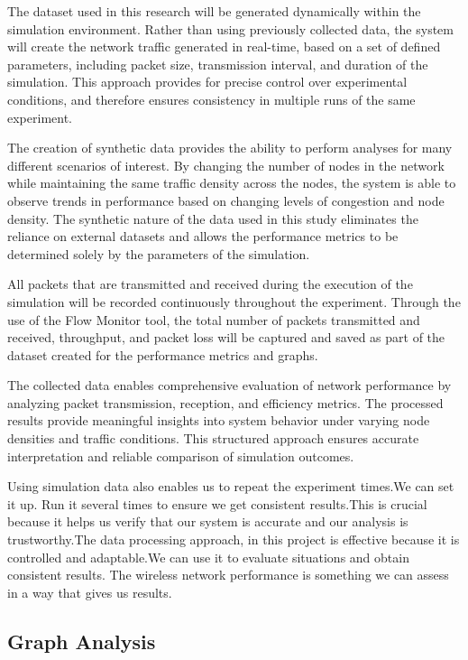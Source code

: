 \documentclass[a4paper,fleqn]{cas-dc}
\numberwithin{equation}{section}
\begin{document}
The dataset used in this research will be generated dynamically within the simulation environment. Rather than using previously collected data, the system will create the network traffic generated in real-time, based on a set of defined parameters, including packet size, transmission interval, and duration of the simulation. This approach provides for precise control over experimental conditions, and therefore ensures consistency in multiple runs of the same experiment.

The creation of synthetic data provides the ability to perform analyses for many different scenarios of interest. By changing the number of nodes in the network while maintaining the same traffic density across the nodes, the system is able to observe trends in performance based on changing levels of congestion and node density. The synthetic nature of the data used in this study eliminates the reliance on external datasets and allows the performance metrics to be determined solely by the parameters of the simulation.

All packets that are transmitted and received during the execution of the simulation will be recorded continuously throughout the experiment. Through the use of the Flow Monitor tool, the total number of packets transmitted and received, throughput, and packet loss will be captured and saved as part of the dataset created for the performance metrics and graphs.

The collected data enables comprehensive evaluation of network performance by analyzing packet transmission, reception, and efficiency metrics. The processed results provide meaningful insights into system behavior under varying node densities and traffic conditions. This structured approach ensures accurate interpretation and reliable comparison of simulation outcomes.


Using simulation data also enables us to repeat the experiment times.We can set it up. Run it several times to ensure we get consistent results.This is crucial because it helps us verify that our system is accurate and our analysis is trustworthy.The data processing approach, in this project is effective because it is controlled and adaptable.We can use it to evaluate situations and obtain consistent results.
The wireless network performance is something we can assess in a way that gives us results.

\subsection{Graph  Analysis}
\end{document}
